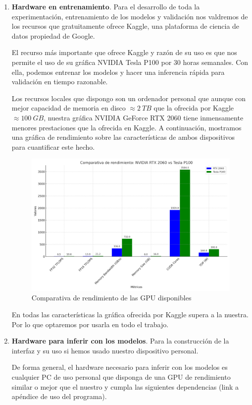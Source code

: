 \begin{enumerate}
	\item \textbf{Hardware en entrenamiento}. Para el desarrollo de toda la experimentación, entrenamiento de los modelos y validación nos valdremos de los recursos que gratuitamente ofrece Kaggle, una plataforma de ciencia de datos propiedad de Google. 
	
	El recurso más importante que ofrece Kaggle y razón de su uso es que nos permite el uso de su gráfica NVIDIA Tesla P100 por 30 horas semanales. Con ella, podemos entrenar los modelos y hacer una inferencia rápida para validación en tiempo razonable.
	
	Los recursos locales que dispongo son un ordenador personal que aunque con mejor capacidad de memoria en disco $\approx 2\ TB$ que la ofrecida por Kaggle $\approx 100\ GB$, nuestra gráfica NVIDIA GeForce RTX 2060 tiene inmensamente menores prestaciones que la ofrecida en Kaggle. A continuación, mostramos una gráfica de rendimiento sobre las características de ambos dispositivos para cuantificar este hecho.
	
	\begin{figure}[H]
		\centering
		\includegraphics[width=1.0\linewidth]{imagenes/comparativa_rtx2060tesla.png}
		\caption{Comparativa de rendimiento de las GPU disponibles}
	\end{figure}
	
	En todas las características la gráfica ofrecida por Kaggle supera a la nuestra. Por lo que optaremos por usarla en todo el trabajo.
	
	\item \textbf{Hardware para inferir con los modelos}. Para la construcción de la interfaz y su uso si hemos usado nuestro dispositivo personal.
	
	De forma general, el hardware necesario para inferir con los modelos es cualquier PC de uso personal que disponga de una GPU de rendimiento similar o mejor que el nuestro y cumpla las siguientes dependencias (link a apéndice de uso del programa). 
	
\end{enumerate}


